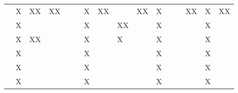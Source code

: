 
\begin{tabular}{llllllllllllllll}
&X&XX&XX&&&X&XX&&XX&X&&&XX&X&XX\\
&X&&&&&X&&XX&&X&&&&X&\\
&X&XX&&&&X&&X&&X&&&&X&\\
&X&&&&&X&&&&X&&&&X&\\
&X&&&&&X&&&&X&&&&X&\\
&X&&&&&X&&&&X&&&&X&\\
\end{tabular}
